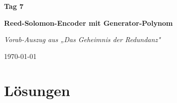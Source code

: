 \documentclass[
  11pt,
  a4paper,
  twoside,
  parskip=half,
  numbers=noenddot,
  open=right,
]{scrbook}
\begin{document}
\frontmatter

\begin{titlepage}
  \centering
  \vspace*{5cm}
  {\Huge\bfseries Tag 7\par}
  \vspace{0.6cm}
  {\Large\bfseries Reed-Solomon-Encoder mit Generator-Polynom\par}
  \vspace{1.2cm}
  {\Large\itshape Vorab-Auszug aus „Das Geheimnis der Redundanz"\par}
  \vfill
  {\large \today\par}
  \vspace*{1.5cm}
\end{titlepage}

\mainmatter
\setcounter{chapter}{6}   %


\appendix
\chapter*{Lösungen}

\end{document}
